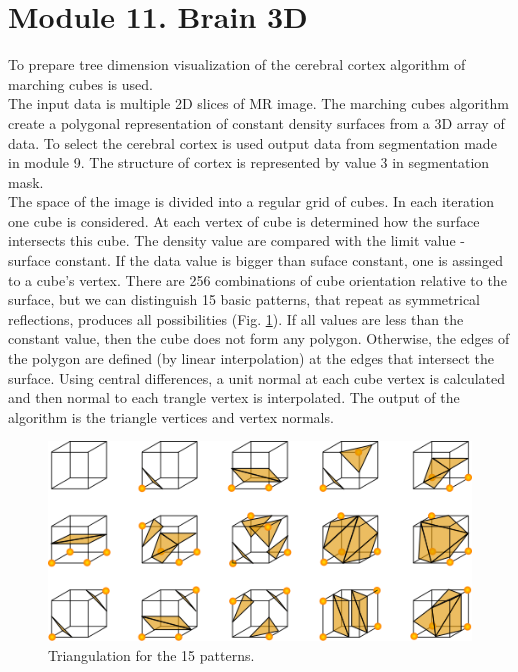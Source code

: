 \section{Module 11. Brain 3D}

\indent To prepare tree dimension visualization of the cerebral cortex algorithm of marching cubes
is used.\\
 \indent The input data is multiple 2D slices of MR image. The marching cubes algorithm create a polygonal representation of constant density surfaces from a 3D array of data. To select the cerebral cortex is used output data from segmentation made in module 9. The structure of cortex is represented by value 3 in segmentation mask. \\
\indent The space of the image is divided into a regular grid of cubes. In each iteration one cube is considered. At each vertex of cube is determined how the surface intersects this cube. The density value are compared with the limit value - surface constant. If the data value is bigger than suface constant, one is assinged to a cube’s vertex. There are 256 combinations of cube orientation relative to the surface, but we can distinguish 15 basic patterns, that repeat as symmetrical reflections, produces all possibilities (Fig. \ref{fig:figures/Marching cubes}). If all values are less than the constant value, then the cube does not form any polygon. Otherwise, the edges of the polygon are defined (by linear interpolation) at the edges that intersect the surface. Using central differences, a unit normal at each cube vertex is calculated and then normal to each trangle vertex is interpolated. The output of the algorithm is the triangle vertices and vertex normals. \cite{11_mc}

\begin{figure}[H]
\centering{}\includegraphics[scale=0.7]{figures/MarchingCubes}\caption{Triangulation for the 15 patterns. \label{fig:figures/Marching cubes}}
\end{figure}

